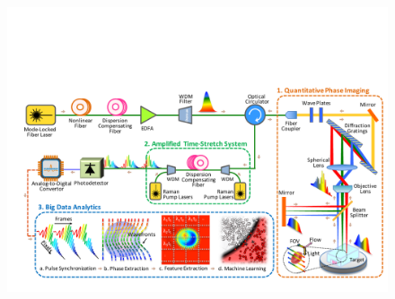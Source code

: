 \documentclass[aps,pra,reprint,superscriptaddress]{revtex4-1}
\begin{document}
\begin{figure}
\includegraphics[scale=0.7]{FigureSetup.pdf}

\end{figure}
\end{document}
